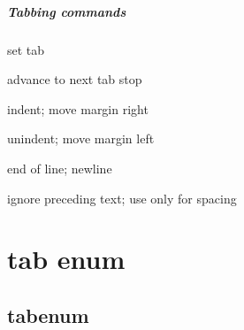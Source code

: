 		\paragraph{Tabbing commands}
		\begin{description}[itemsep=-0.5em,style=sameline]
		\item [\textbackslash =] set tab
		\item [\textbackslash $>$] advance to next tab stop
		\item [\textbackslash $<$]
		\item [\textbackslash $+$] indent; move margin right
		\item [\textbackslash $-$] unindent; move margin left
		\item [\textbackslash ']
		\item [\textbackslash `]
		\item [\textbackslash \textbackslash] end of line; newline
		\item [\textbackslash kill] ignore preceding text; use only for spacing
		\end{description}




	\chapter{tab enum}


\section{tabenum}



